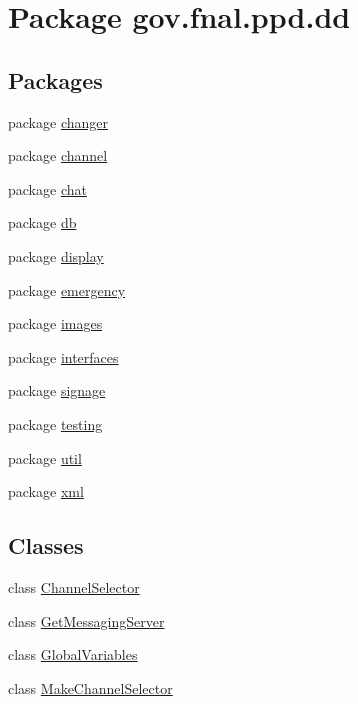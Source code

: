 \hypertarget{namespacegov_1_1fnal_1_1ppd_1_1dd}{\section{Package gov.\-fnal.\-ppd.\-dd}
\label{namespacegov_1_1fnal_1_1ppd_1_1dd}
}
\subsection*{Packages}
\begin{DoxyCompactItemize}
\item 
package \hyperlink{namespacegov_1_1fnal_1_1ppd_1_1dd_1_1changer}{changer}
\item 
package \hyperlink{namespacegov_1_1fnal_1_1ppd_1_1dd_1_1channel}{channel}
\item 
package \hyperlink{namespacegov_1_1fnal_1_1ppd_1_1dd_1_1chat}{chat}
\item 
package \hyperlink{namespacegov_1_1fnal_1_1ppd_1_1dd_1_1db}{db}
\item 
package \hyperlink{namespacegov_1_1fnal_1_1ppd_1_1dd_1_1display}{display}
\item 
package \hyperlink{namespacegov_1_1fnal_1_1ppd_1_1dd_1_1emergency}{emergency}
\item 
package \hyperlink{namespacegov_1_1fnal_1_1ppd_1_1dd_1_1images}{images}
\item 
package \hyperlink{namespacegov_1_1fnal_1_1ppd_1_1dd_1_1interfaces}{interfaces}
\item 
package \hyperlink{namespacegov_1_1fnal_1_1ppd_1_1dd_1_1signage}{signage}
\item 
package \hyperlink{namespacegov_1_1fnal_1_1ppd_1_1dd_1_1testing}{testing}
\item 
package \hyperlink{namespacegov_1_1fnal_1_1ppd_1_1dd_1_1util}{util}
\item 
package \hyperlink{namespacegov_1_1fnal_1_1ppd_1_1dd_1_1xml}{xml}
\end{DoxyCompactItemize}
\subsection*{Classes}
\begin{DoxyCompactItemize}
\item 
class \hyperlink{classgov_1_1fnal_1_1ppd_1_1dd_1_1ChannelSelector}{Channel\-Selector}
\item 
class \hyperlink{classgov_1_1fnal_1_1ppd_1_1dd_1_1GetMessagingServer}{Get\-Messaging\-Server}
\item 
class \hyperlink{classgov_1_1fnal_1_1ppd_1_1dd_1_1GlobalVariables}{Global\-Variables}
\item 
class \hyperlink{classgov_1_1fnal_1_1ppd_1_1dd_1_1MakeChannelSelector}{Make\-Channel\-Selector}
\end{DoxyCompactItemize}


